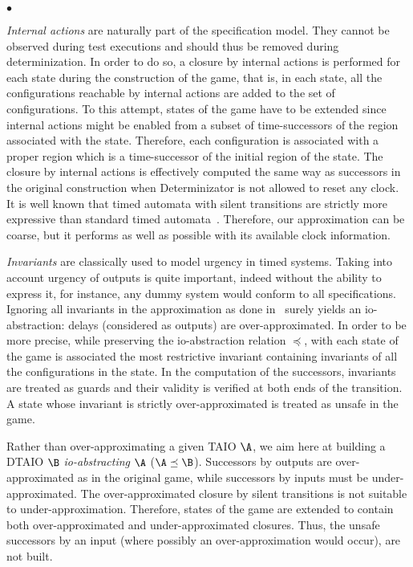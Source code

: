\documentclass{LMCS}
\theoremstyle{plain}\newtheorem{proposition}[thm]{Proposition}
\begin{document}
\begin{iteMize}{$\bullet$}
\item
\textit{Internal actions} are naturally part of the specification
  model.  They cannot be observed during test executions and should
  thus be removed during determinization.  In order to do so, a
  closure by internal actions is performed for each state during the
  construction of the game, that is, in each state, all the configurations reachable by internal
  actions are added to the set of configurations. To this attempt, states of the game have to be extended since internal 
actions might be enabled from a subset of time-successors 
of the region associated with the state.  Therefore, each
configuration is associated with a proper region which is a
time-successor of the initial region of the state.
The closure by internal actions is effectively computed the same way
as successors in the original construction when Determinizator is
  not allowed to reset any clock.
It is well known that timed automata with silent transitions are
  strictly more expressive than standard timed
  automata~\cite{BerardGastinPetit-STACS96}.  Therefore, our
  approximation can be coarse, but it performs as well as possible
  with its available clock information.
\item
\textit{Invariants} are classically used to model urgency in timed
  systems.
Taking into account urgency of outputs is quite important, indeed
  without the ability to express it, for instance, any dummy system would conform to all specifications. Ignoring all
  invariants in the approximation as done in~\cite{KrichenTripakis09}
  surely yields an io-abstraction: delays (considered as outputs) are
  over-approximated.  In order to be more precise, while preserving
  the io-abstraction relation $\preceq$, with each state of the game
  is associated the most restrictive invariant containing invariants
  of all the configurations in the state.  In the computation of the
  successors, invariants are treated as guards and their validity is
  verified at both ends of the transition.  A state whose
  invariant is strictly over-approximated is treated as unsafe in the
  game.
\item
Rather than over-approximating a given TAIO $\A$, we aim here at
building a DTAIO $\B$ \textit{io-abstracting} $\A$ ($\A \preceq
\B$).
Successors by outputs are over-approximated as in the original game,
while successors by inputs must be under-approximated. The over-approximated closure by silent transitions is not suitable to under-approximation.
Therefore, states of the game are extended to contain both over-approximated and under-approximated closures.
Thus, the
unsafe successors by an input (where possibly an over-approximation
would occur), are not built.
\end{iteMize}
\end{document}
